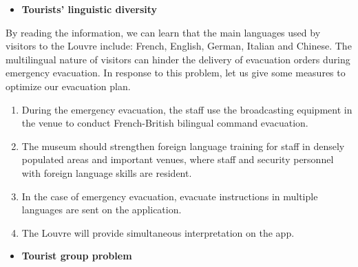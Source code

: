 \begin{itemize}
    \item \textbf{Tourists' linguistic diversity}
\end{itemize}

By reading the information, we can learn that the main languages used by visitors to the Louvre include: French, English, German, Italian and Chinese. The multilingual nature of visitors can hinder the delivery of evacuation orders during emergency evacuation. In response to this problem, let us give some measures to optimize our evacuation plan.
 
 \begin{enumerate}
     \item During the emergency evacuation, the staff use the broadcasting equipment in the venue to conduct French-British bilingual command evacuation.
     \item  The museum should strengthen foreign language training for staff in densely populated areas and important venues, where staff and security personnel with foreign language skills are resident.
     \item In the case of emergency evacuation, evacuate instructions in multiple languages are sent on the application.
     \item The Louvre will provide simultaneous interpretation on the app.
 \end{enumerate}

\begin{itemize}
    \item \textbf{Tourist group problem}
\end{itemize}

